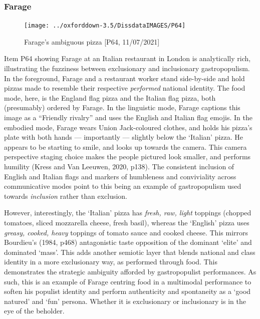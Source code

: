 \documentclass[a4paper, nobind]{templates/ociamthesis}
\begin{document}
\hypertarget{farage-2}{%
\subsubsection*{Farage}\label{farage-2}}

\begin{figure}
\texttt{[image: ../oxforddown-3.5/DissdataIMAGES/P64]} \caption{Farage's ambiguous pizza [P64, 11/07/2021]}\label{fig:unnamed-chunk-19}
\end{figure}

Item P64 showing Farage at an Italian restaurant in London is analytically rich, illustrating the fuzziness between exclusionary and inclusionary gastropopulism.
In the foreground, Farage and a restaurant worker stand side-by-side and hold pizzas made to resemble their respective \emph{performed} national identity.
The food mode, here, is the England flag pizza and the Italian flag pizza, both (presumably) ordered by Farage.
In the linguistic mode, Farage captions this image as a ``Friendly rivalry'' and uses the English and Italian flag emojis.
In the embodied mode, Farage wears Union Jack-coloured clothes, and holds his pizza's plate with both hands --- importantly --- slightly below the `Italian' pizza.
He appears to be starting to smile, and looks up towards the camera.
This camera perspective staging choice makes the people pictured look smaller, and performs humility (Kress and Van Leeuwen, 2020, p138).
The consistent inclusion of English and Italian flags and markers of humbleness and conviviality across communicative modes point to this being an example of gastropopulism used towards \emph{inclusion} rather than exclusion.

However, interestingly, the `Italian' pizza has \emph{fresh, raw, light} toppings (chopped tomatoes, sliced mozzarella cheese, fresh basil), whereas the `English' pizza uses \emph{greasy, cooked, heavy} toppings of tomato sauce and cooked cheese. This mirrors Bourdieu's (1984, p468) antagonistic taste opposition of the dominant `elite' and dominated `mass'.
This adds another semiotic layer that blends national and class identity in a more exclusionary way, as performed through food.
This demonstrates the strategic ambiguity afforded by gastropopulist performances.
As such, this is an example of Farage centring food in a multimodal performance to soften his populist identity and perform authenticity and spontaneity as a `good natured' and `fun' persona.
Whether it is exclusionary or inclusionary is in the eye of the beholder.
\end{document}
